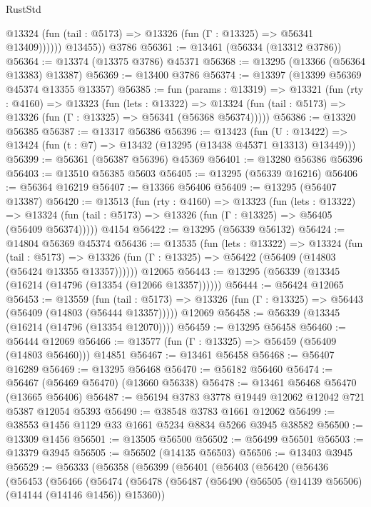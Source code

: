 \begin{lexlean}{RustStd}
\begin{coremodule}
              @13324 (fun (tail : @5173) => @13326 (fun (Γ : @13325) => @56341 @13409))))))
        @13455))
    @3786
@56361 := @13461 (@56334 (@13312 @3786))
@56364 := @13374 (@13375 @3786) @45371
@56368 := @13295 (@13366 (@56364 @13383) @13387)
@56369 := @13400 @3786
@56374 := @13397 (@13399 @56369 @45374 @13355 @13357)
@56385 := fun (params : @13319) =>
  @13321
    (fun (rty : @4160) =>
    @13323
      (fun (lets : @13322) =>
      @13324 (fun (tail : @5173) => @13326 (fun (Γ : @13325) => @56341 (@56368 @56374)))))
@56386 := @13320 @56385
@56387 := @13317 @56386
@56396 := @13423
    (fun (U : @13422) => @13424 (fun (t : @7) => @13432 (@13295 (@13438 @45371 @13313) @13449)))
@56399 := @56361 (@56387 @56396) @45369
@56401 := @13280 @56386 @56396
@56403 := @13510 @56385 @5603
@56405 := @13295 (@56339 @16216)
@56406 := @56364 @16219
@56407 := @13366 @56406
@56409 := @13295 (@56407 @13387)
@56420 := @13513
    (fun (rty : @4160) =>
    @13323
      (fun (lets : @13322) =>
      @13324 (fun (tail : @5173) => @13326 (fun (Γ : @13325) => @56405 (@56409 @56374)))))
    @4154
@56422 := @13295 (@56339 @56132)
@56424 := @14804 @56369 @45374
@56436 := @13535
    (fun (lets : @13322) =>
    @13324
      (fun (tail : @5173) =>
      @13326 (fun (Γ : @13325) => @56422 (@56409 (@14803 (@56424 @13355 @13357))))))
    @12065
@56443 := @13295 (@56339 (@13345 (@16214 (@14796 (@13354 (@12066 @13357))))))
@56444 := @56424 @12065
@56453 := @13559
    (fun (tail : @5173) => @13326 (fun (Γ : @13325) => @56443 (@56409 (@14803 (@56444 @13357)))))
    @12069
@56458 := @56339 (@13345 (@16214 (@14796 (@13354 @12070))))
@56459 := @13295 @56458
@56460 := @56444 @12069
@56466 := @13577 (fun (Γ : @13325) => @56459 (@56409 (@14803 @56460))) @14851
@56467 := @13461 @56458
@56468 := @56407 @16289
@56469 := @13295 @56468
@56470 := @56182 @56460
@56474 := @56467 (@56469 @56470) (@13660 @56338)
@56478 := @13461 @56468 @56470 (@13665 @56406)
@56487 := @56194 @3783 @3778 @19449 @12062 @12042 @721 @5387 @12054 @5393
@56490 := @38548 @3783 @1661 @12062
@56499 := @38553 @1456 @1129 @33 @1661 @5234 @8834 @5266 @3945 @38582
@56500 := @13309 @1456
@56501 := @13505 @56500
@56502 := @56499 @56501
@56503 := @13379 @3945
@56505 := @56502 (@14135 @56503)
@56506 := @13403 @3945
@56529 := @56333
    (@56358
      (@56399
        (@56401
          (@56403
            (@56420
              (@56436
                (@56453
                  (@56466
                    (@56474
                      (@56478
                        (@56487
                          (@56490 (@56505 (@14139 @56506) (@14144 (@14146 @1456)) @15360))

\end{coremodule}
\end{lexlean}
